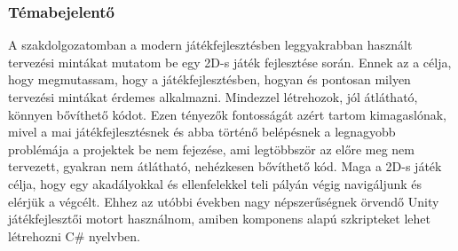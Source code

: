 \subsubsection{Témabejelentő}
A szakdolgozatomban a modern játékfejlesztésben leggyakrabban használt tervezési mintákat mutatom be egy 2D-s játék fejlesztése
során. Ennek az a célja, hogy megmutassam, hogy a játékfejlesztésben, hogyan és pontosan milyen tervezési mintákat érdemes
alkalmazni. Mindezzel létrehozok, jól átlátható, könnyen bővíthető kódot. Ezen tényezők fontosságát azért tartom kimagaslónak,
mivel a mai játékfejlesztésnek és abba történő belépésnek a legnagyobb problémája a projektek be nem fejezése, ami legtöbbször az
előre meg nem tervezett, gyakran nem átlátható, nehézkesen bővíthető kód. Maga a 2D-s játék célja, hogy egy akadályokkal és
ellenfelekkel teli pályán végig navigáljunk és elérjük a végcélt. Ehhez az utóbbi években nagy népszerűségnek örvendő Unity
játékfejlesztői motort használnom, amiben komponens alapú szkripteket lehet létrehozni C\# nyelvben.
